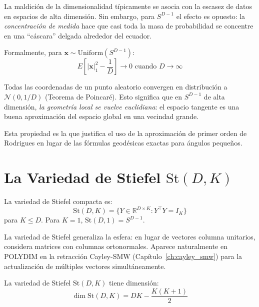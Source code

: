 La maldición de la dimensionalidad típicamente se asocia con la escasez de datos
en espacios de alta dimensión. Sin embargo, para $S^{D-1}$ el efecto es opuesto:
la \textit{concentración de medida} hace que casi toda la masa de probabilidad
se concentre en una ``cáscara'' delgada alrededor del ecuador.

Formalmente, para $\mathbf{x} \sim \text{Uniform}(S^{D-1})$:
\begin{equation}
E\left[|{\mathbf{x}|_1^2 - \frac{1}{D}}\right] \to 0 \text{ cuando } D \to \infty
\end{equation}

Todas las coordenadas de un punto aleatorio convergen en distribución a
$\mathcal{N}(0, 1/D)$ (Teorema de Poincaré). Esto significa que en $S^{D-1}$
de alta dimensión, \textit{la geometría local se vuelve euclidiana}: el espacio
tangente es una buena aproximación del espacio global en una vecindad grande.

Esta propiedad es la que justifica el uso de la aproximación de primer orden de
Rodrigues en lugar de las fórmulas geodésicas exactas para ángulos pequeños.

\section{La Variedad de Stiefel $\text{St}(D, K)$}

\begin{definition}
La variedad de Stiefel compacta es:
\begin{equation}
\text{St}(D, K) = \{Y \in \mathbb{R}^{D \times K} : Y^\top Y = I_K\}
\end{equation}
para $K \le D$. Para $K = 1$, $\text{St}(D, 1) = S^{D-1}$.
\end{definition}

La variedad de Stiefel generaliza la esfera: en lugar de vectores columna unitarios,
considera matrices con columnas ortonormales. Aparece naturalmente en POLYDIM
en la retracción Cayley-SMW (Capítulo~\ref{ch:cayley_smw}) para la actualización
de múltiples vectores simultáneamente.

\begin{theorem}

La variedad de Stiefel $\text{St}(D,K)$ tiene dimensión:
\begin{equation}
\dim \text{St}(D,K) = DK - \frac{K(K+1)}{2}
\end{equation}
\end{theorem}

